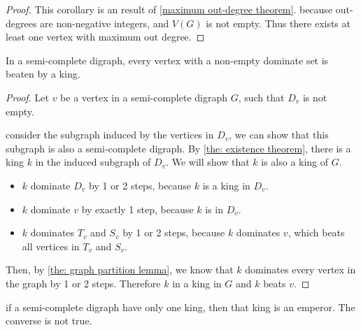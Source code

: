   \begin{proof}
    This corollary is an result of \cref{maximum out-degree theorem}.
    because out-degrees are non-negative integers,
    and \(V(G)\) is not empty.
    Thus there exists at least one vertex with maximum out degree.
  \end{proof}

  \begin{theorem}\label{the: beaten by king theorem}
    In a semi-complete digraph,
    every vertex with a non-empty dominate set
    is beaten by a king.
  \end{theorem}

  \begin{proof}
    Let \(v\) be a vertex in a semi-complete digraph \(G\),
    such that \(D_v\) is not empty.

    consider the subgraph induced by the vertices in \(D_v\),
    we can show that this subgraph is also a semi-complete digraph.
    By \cref{the: existence theorem},
    there is a king \(k\) in the induced subgraph of \(D_v\).
    We will show that \(k\) is also a king of \(G\).
    \begin{itemize}
      \item
        \(k\) dominate \(D_v\) by 1 or 2 steps,
        because \(k\) is a king in \(D_v\).
      \item
        \(k\) dominate \(v\) by exactly 1 step,
        because \(k\) is in \(D_v\).
      \item
        \(k\) dominates \(T_v\) and \(S_v\) by 1 or 2 steps,
        because \(k\) dominates \(v\),
        which beats all vertices in \(T_v\) and \(S_v\).
    \end{itemize}

    Then, by \cref{the: graph partition lemma},
    we know that \(k\) dominates
    every vertex in the graph by 1 or 2 steps.
    Therefore \(k\) in a king in \(G\) and \(k\) beats \(v\).
  \end{proof}

  \begin{corollary}
    if a semi-complete digraph have only one king,
    then that king is an emperor. The converse is not true.
  \end{corollary}


